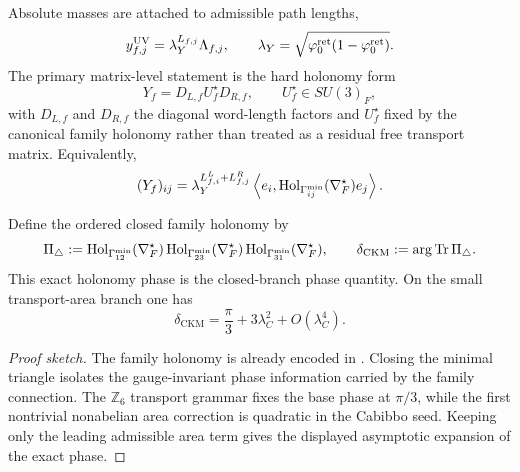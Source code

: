 Absolute masses are attached to admissible path lengths,
\begin{equation}
\label{eq:path-length-yukawa}
y_{f,j}^{\mathrm{UV}}=\lambda_Y^{L_{f,j}}\Lambda_{f,j},
\qquad
\lambda_Y=\sqrt{\varphi_0^{\mathrm{ret}}(1-\varphi_0^{\mathrm{ret}})}.
\end{equation}
The primary matrix-level statement is the hard holonomy form
\begin{equation}
\label{eq:yukawa-matrix-factorization}
Y_f=D_{L,f}U_f^\star D_{R,f},
\qquad
U_f^\star\in SU(3)_F,
\end{equation}
with $D_{L,f}$ and $D_{R,f}$ the diagonal word-length factors and $U_f^\star$ fixed by the
canonical family holonomy rather than treated as a residual free transport matrix. Equivalently,
\begin{equation}
\label{eq:yukawa-holonomy-matrix}
(Y_f)_{ij}
=
\lambda_Y^{L^L_{f,i}+L^R_{f,j}}
\left\langle e_i,\mathrm{Hol}_{\Gamma_{ij}^{\min}}(\nabla_F^\star)e_j\right\rangle.
\end{equation}
\begin{theorem}
\label{prop:holonomy-triangle-phase}
\label{prop:exact-family-holonomy-phase}
Define the ordered closed family holonomy by
\[
\Pi_\triangle
:=
\mathrm{Hol}_{\Gamma_{12}^{\min}}(\nabla_F^\star)\,
\mathrm{Hol}_{\Gamma_{23}^{\min}}(\nabla_F^\star)\,
\mathrm{Hol}_{\Gamma_{31}^{\min}}(\nabla_F^\star),
\qquad
\delta_{\mathrm{CKM}}
:=
\arg\operatorname{Tr}\Pi_\triangle.
\]
This exact holonomy phase is the closed-branch phase quantity. On the
small transport-area branch one has
\begin{equation}
\label{eq:ckm-holonomy-phase}
\delta_{\mathrm{CKM}}
=
\frac{\pi}{3}+3\lambda_C^2+O(\lambda_C^4).
\end{equation}
\end{theorem}

\begin{proof}[Proof sketch]
The family holonomy is already encoded in . Closing the
minimal triangle isolates the gauge-invariant phase information carried by the family
connection. The $\mathbb Z_6$ transport grammar fixes the base phase at $\pi/3$, while the
first nontrivial nonabelian area correction is quadratic in the Cabibbo seed. Keeping only the
leading admissible area term gives the displayed asymptotic expansion of the exact phase.
\end{proof}

